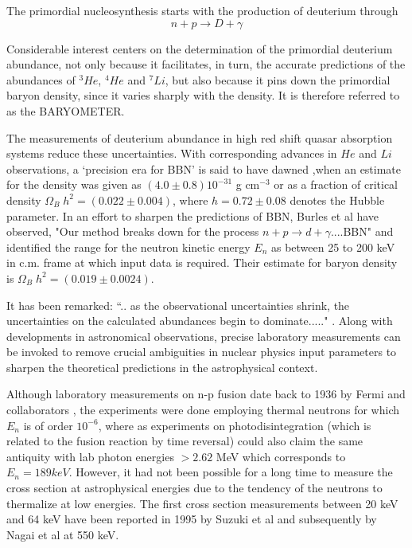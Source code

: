 The primordial nucleosynthesis starts with the production of deuterium through
$$
n+p \to D+ \gamma
$$

Considerable interest centers on the determination of the primordial deuterium abundance, not only because it facilitates, in turn, the accurate predictions of the abundances of $^3He$, $^4He$ and $^7Li$, but also because it pins down the primordial baryon density, since it varies sharply with  the density. It is therefore referred to as the BARYOMETER.

The measurements of deuterium abundance in high red shift quasar absorption systems \cite{chap34-key15} reduce these uncertainties. With corresponding advances in $He$ and $Li$ observations, a `precision era for BBN' is said to have dawned \cite{chap34-key16},when an estimate for the density was given as $(4.0 \pm 0.8) 10^{-31}$ g cm$^{-3}$ or as a fraction of critical density $\Omega_B \;h^{2} = (0.022\pm 0.004)$, where $h=0.72\pm 0.08$ denotes the Hubble parameter.   In an effort to sharpen the predictions of BBN, Burles et al \cite{chap34-key17} have observed, "Our method breaks down for the process $n + p \to d+\gamma$....BBN" and identified the range for the neutron kinetic energy $E_n$ as between 25 to 200 keV in c.m. frame at which input data is required. Their estimate for baryon density  is $\Omega_B \;h^{2} = (0.019\pm 0.0024)$. 

It has been remarked: ``.. as the observational uncertainties shrink, the uncertainties on the  calculated abundances begin to dominate....." \cite {chap34-key18}. Along with  developments in astronomical observations, precise laboratory measurements can be invoked to remove crucial ambiguities in nuclear  physics input parameters to sharpen the theoretical predictions in the astrophysical context. 

Although laboratory  measurements on n-p fusion date back to 1936 by Fermi and collaborators \cite{chap34-key19}, the experiments were done employing thermal neutrons for which $E_n$ is of order $10^{-6}$, where as experiments on  photodisintegration (which is related to the fusion reaction by time reversal) could also claim the same antiquity with lab photon energies $> 2.62$ MeV which corresponds to $E_n = 189 keV$. However, it had not been possible  for a long time to measure the cross section at astrophysical energies due to the tendency of the neutrons to thermalize at low energies. The first cross section measurements between 20 keV and 64 keV have been reported in 1995 by Suzuki et al \cite{chap34-key20} and subsequently by Nagai et al \cite{chap34-key21} at 550 keV. 

